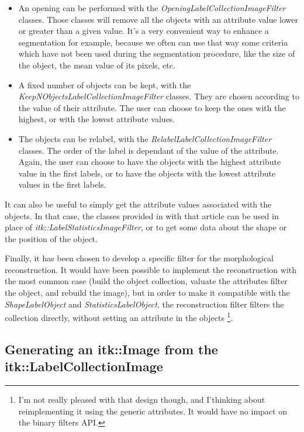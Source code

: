 \documentclass{InsightArticle}
\begin{document}
\begin{itemize}
  \item An opening can be performed with the {\em
OpeningLabelCollectionImageFilter} classes. Those classes will remove all the
objects with an attribute value lower or greater than a given value. It's a very
convenient way to enhance a segmentation for example, because we often can use
that way some criteria  which have not been used during the segmentation
procedure, like the size of the object, the mean value of its pixels, etc.
  \item A fixed number of objects can be kept, with the {\em
KeepNObjectsLabelCollectionImageFilter} classes. They are chosen according to
the value of their attribute. The user can choose to keep the ones with the
highest, or with the lowest attribute values.
  \item The objects can be relabel, with the {\em
RelabelLabelCollectionImageFilter} classes. The order of the label is dependant
of the value of the attribute. Again, the user can choose to have the objects
with the highest attribute value in the first labels, or to have the objects
with the lowest attribute values in the first labels.
\end{itemize}

It can also be useful to simply get the attribute values associated with the
objects. In that case, the classes provided in with that article can be used in
place of {\em itk::LabelStatisticsImageFilter}, or to get some data about the
shape or the position of the object.

Finally, it has been chosen to develop a specific filter for the morphological
reconstruction. It would have been possible to implement the reconstruction
with the most common case (build the object collection, valuate the attributes
filter the object, and rebuild the image), but in order to make it compatible
with the {\em ShapeLabelObject} and {\em StatisticsLabelObject}, the reconstruction
filter filters the collection directly, without setting an attribute in the objects
\footnote{I'm not really pleased with that design though, and I'thinking about
reimplementing it using the generic attributes. It would have no impact on the
binary filters API.}.

\subsection{Generating an itk::Image from the itk::LabelCollectionImage}
\end{document}
